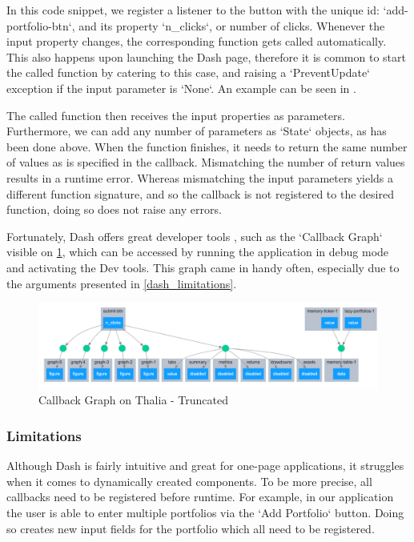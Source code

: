 In this code snippet, we register a listener to the button with the unique id: `add-portfolio-btn`, and its property `n\_clicks`, or number of clicks. Whenever the input property changes, the corresponding function gets called automatically. This also happens upon launching the Dash page, therefore it is common to start the called function by catering to this case, and raising a `PreventUpdate` exception if the input parameter is `None`. An example can be seen in \cite{prevent_update}.

The called function then receives the input properties as parameters. Furthermore, we can add any number of parameters as `State` objects, as has been done above. When the function finishes, it needs to return the same number of values as is specified in the callback. Mismatching the number of return values results in a runtime error. Whereas mismatching the input parameters yields a different function signature, and so the callback is not registered to the desired function, doing so does not raise any errors. 

Fortunately, Dash offers great developer tools \cite{dash_dev_tools}, such as the `Callback Graph` visible on \figurename{\ref{callback_graph}}, which can be accessed by running the application in debug mode and activating the Dev tools. This graph came in handy often, especially due to the arguments presented in \ref{dash_limitations}.

 \begin{figure}[H]
   \centering
   \includegraphics[width=\textwidth]{06Coding/05Pictures/callback_graph.png}
   \caption{Callback Graph on Thalia - Truncated}
   \label{callback_graph}
\end{figure}


\subsubsection*{Limitations}
\label{dash_limitations}

Although Dash is fairly intuitive and great for one-page applications, it struggles when it comes to dynamically created components. To be more precise, all callbacks need to be registered before runtime. For example, in our application the user is able to enter multiple portfolios via the `Add Portfolio` button. Doing so creates new input fields for the portfolio which all need to be registered. 

